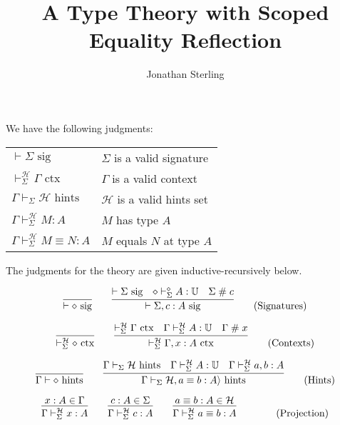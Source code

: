\documentclass{amsart}
\title{A Type Theory with Scoped Equality Reflection}
\author{Jonathan Sterling}
\begin{document}
\maketitle

\def\emp{\diamond}
\def\sig{\mbox{ sig}}
\def\ctx{\mbox{ ctx}}
\def\hints{\mbox{ hints}}
\def\fresh{\mathrel{\#}}

\noindent
We have the following judgments:

\bigskip
\begin{tabular}{ll}
$\vdash\Sigma\sig$                            & $\Sigma$ is a valid signature\\
$\vdash_\Sigma^\mathcal{H}\Gamma\ctx$         & $\Gamma$ is a valid context\\
$\Gamma\vdash_\Sigma\mathcal{H}\hints$        & $\mathcal{H}$ is a valid hints set\\
$\Gamma\vdash_\Sigma^\mathcal{H} M:A$         & $M$ has type $A$\\
$\Gamma\vdash_\Sigma^\mathcal{H} M\equiv N:A$ & $M$ equals $N$ at type $A$
\end{tabular}
\bigskip

\noindent
The judgments for the theory are given inductive-recursively below.

\begin{equation}
  \infer{\vdash\emp\sig}{}
  \qquad
  \infer{
    \vdash\Sigma,c:A\sig
  }{
    \vdash\Sigma\sig &
    \emp\vdash_\Sigma^\emp A:\mathbb{U} &
    \Sigma\fresh c
  }
  \tag{Signatures}
\end{equation}

\begin{equation}
  \infer{\vdash_\Sigma^\mathcal{H}\emp\ctx}{}
  \qquad
  \infer{
    \vdash_\Sigma^\mathcal{H}\Gamma,x:A\ctx
  }{
    \vdash_\Sigma^\mathcal{H}\Gamma\ctx &
    \Gamma\vdash_\Sigma^\mathcal{H} A:\mathbb{U} &
    \Gamma\fresh x
  }
  \tag{Contexts}
\end{equation}

\begin{equation}
  \infer{\Gamma\vdash \emp\hints}{}
  \qquad
  \infer{
    \Gamma\vdash_\Sigma \mathcal{H}, a\equiv b:A\rangle\hints
  }{
    \Gamma\vdash_\Sigma \mathcal{H}\hints &
    \Gamma\vdash_\Sigma^\mathcal{H} A: \mathbb{U} &
    \Gamma\vdash_\Sigma^\mathcal{H} a,b : A
  }
  \tag{Hints}
\end{equation}

\begin{equation}
  \infer{
    \Gamma\vdash_\Sigma^\mathcal{H} x:A
  }{
    x:A\in\Gamma
  }
  \qquad
  \infer{
    \Gamma\vdash_\Sigma^\mathcal{H} c:A
  }{
    c:A\in\Sigma
  }
  \qquad
  \infer{
    \Gamma\vdash_\Sigma^\mathcal{H} a\equiv b:A
  }{
    a\equiv b:A \in \mathcal{H}
  }
  \qquad
  \tag{Projection}
\end{equation}
\end{document}
